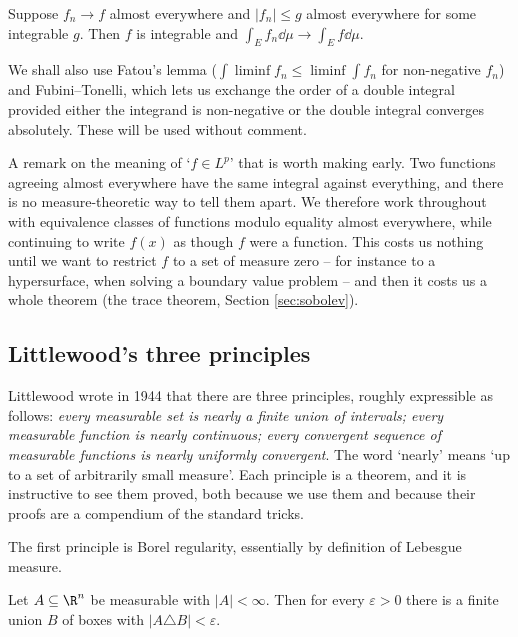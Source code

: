 \begin{theorem}\label{aof-thm:dct}
	Suppose $f_n \to f$ almost everywhere and $|f_n| \le g$ almost everywhere for some integrable $g$. Then $f$ is integrable and $\int_E f_n \dd \mu \to \int_E f \dd \mu$.
\end{theorem}

We shall also use Fatou's lemma ($\int \liminf f_n \le \liminf \int f_n$ for non-negative $f_n$) and Fubini--Tonelli, which lets us exchange the order of a double integral provided either the integrand is non-negative or the double integral converges absolutely. These will be used without comment.

\begin{remark}
	A remark on the meaning of `$f \in L^p$' that is worth making early. Two functions agreeing almost everywhere have the same integral against everything, and there is no measure-theoretic way to tell them apart. We therefore work throughout with equivalence classes of functions modulo equality almost everywhere, while continuing to write $f(x)$ as though $f$ were a function. This costs us nothing until we want to restrict $f$ to a set of measure zero -- for instance to a hypersurface, when solving a boundary value problem -- and then it costs us a whole theorem (the trace theorem, Section \ref{sec:sobolev}).
\end{remark}

\subsection{Littlewood's three principles}

Littlewood wrote in 1944 that there are three principles, roughly expressible as follows: \emph{every measurable set is nearly a finite union of intervals; every measurable function is nearly continuous; every convergent sequence of measurable functions is nearly uniformly convergent}. The word `nearly' means `up to a set of arbitrarily small measure'. Each principle is a theorem, and it is instructive to see them proved, both because we use them and because their proofs are a compendium of the standard tricks.

The first principle is Borel regularity, essentially by definition of Lebesgue measure.

\begin{proposition}\label{prop:littlewood1}
	Let $A \subseteq \R^n$ be measurable with $|A| < \infty$. Then for every $\varepsilon > 0$ there is a finite union $B$ of boxes with $|A \triangle B| < \varepsilon$.
\end{proposition}

